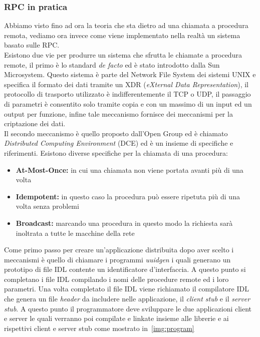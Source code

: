 \subsubsection{RPC in pratica}
Abbiamo visto fino ad ora la teoria che sta dietro ad una chiamata a procedura remota, vediamo ora invece come viene implementato nella realtà un sistema basato sulle RPC.\\
Esistono due vie per produrre un sistema che sfrutta le chiamate a procedura remote, il primo è lo standard \emph{de facto} ed è stato introdotto dalla Sun Microsystem. Questo sistema è parte del Network File System dei sistemi UNIX e specifica il formato dei dati tramite un XDR (\emph{eXternal Data Representation}), il protocollo di trasporto utilizzato è indifferentemente il TCP o UDP, il passaggio di parametri è consentito solo tramite copia e con un massimo di un input ed un output per funzione, infine tale meccanismo fornisce dei meccanismi per la criptazione dei dati.\\
Il secondo meccanismo è quello proposto dall'Open Group ed è chiamato \emph{Distributed Computing Environment} (DCE) ed è un insieme di specifiche e riferimenti. Esistono diverse specifiche per la chiamata di una procedura:
\begin{itemize}
\item \textbf{At-Most-Once:} in cui una chiamata non viene portata avanti più di una volta
\item \textbf{Idempotent:} in questo caso la procedura può essere ripetuta più di una volta senza problemi
\item \textbf{Broadcast:} marcando una procedura in questo modo la richiesta sarà inoltrata a tutte le macchine della rete
\end{itemize}
Come primo passo per creare un'applicazione distribuita dopo aver scelto i meccanismi è quello di chiamare i programmi \emph{uuidgen} i quali generano un prototipo di file IDL contente un identificatore d'interfaccia. A questo punto si completano i file IDL compilando i nomi delle procedure remote ed i loro parametri. Una volta completato il file IDL viene richiamato il compilatore IDL che genera un file \emph{header} da includere nelle applicazione, il \emph{client stub} e il \emph{server stub}. A questo punto il programmatore deve sviluppare le due applicazioni client e server le quali verranno poi compilate e linkate insieme alle librerie e ai rispettivi client e server stub come mostrato in \figurename\,\ref{img:program}
